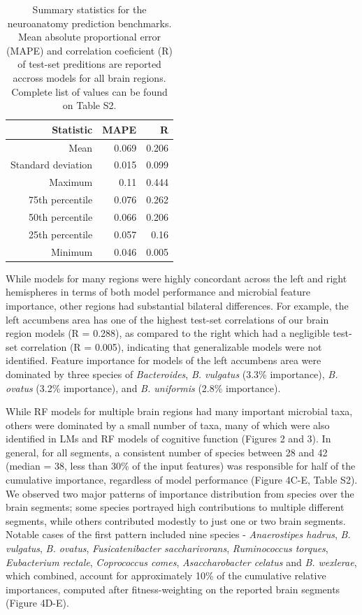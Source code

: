 \documentclass{article}
\begin{document}
\begin{table}[!h]
    \begin{center}
    \begin{tabular}{|r|r|r|}
      \hline\hline
      \textbf{Statistic} & \textbf{MAPE} & \textbf{R} \\\hline
      Mean & 0.069 & 0.206 \\
      Standard deviation & 0.015 & 0.099 \\
      Maximum & 0.11 & 0.444 \\
      75th percentile & 0.076 & 0.262 \\
      50th percentile & 0.066 & 0.206 \\
      25th percentile & 0.057 & 0.16 \\
      Minimum & 0.046 & 0.005 \\\hline
    \end{tabular}
    \caption{\label{tab:neuro}Summary statistics for the neuroanatomy prediction benchmarks.
    Mean absolute proportional error (MAPE) and correlation coeficient (R)
    of test-set preditions are reported accross models for all brain regions.
    Complete list of values can be found on Table S2.}
    \end{center}
\end{table}

While models for many regions were highly concordant across the
left and right hemispheres in terms of both model performance and
microbial feature importance, other regions had substantial
bilateral differences. For example, the left accumbens area
has one of the highest test-set correlations of our
brain region models (R = 0.288), as compared to the right which
had a negligible test-set correlation (R = 0.005),
indicating that generalizable models were not identified.
Feature importance for models of the left accumbens area were dominated
by three species of \emph{Bacteroides}, \emph{B. vulgatus} (3.3\% importance),
\emph{B. ovatus} (3.2\% importance), and
\emph{B. uniformis} (2.8\% importance).

While RF models for multiple brain regions had many important microbial taxa,
others were dominated by a small number of taxa, many of which
were also identified in LMs and RF models of cognitive function (Figures 2 and 3). 
In general, for all segments, a consistent number of species between 28 and 42 (median = 38, less than 30\% of the input features)
was responsible for half of the cumulative importance,
regardless of model performance (Figure 4C-E, Table S2).
We observed two major patterns of importance distribution from
species over the brain segments; some species portrayed high contributions
to multiple different segments, while others contributed modestly to
just one or two brain segments. Notable cases of the first pattern
included nine species - 
\emph{Anaerostipes hadrus},
\emph{B. vulgatus},
\emph{B. ovatus},
\emph{Fusicatenibacter saccharivorans},
\emph{Ruminococcus torques},
\emph{Eubacterium rectale},
\emph{Coprococcus comes},
\emph{Asaccharobacter celatus} and
\emph{B. wexlerae}, which combined, account for approximately 10\% of the cumulative relative importances,
computed after fitness-weighting on the reported brain segments (Figure 4D-E).
\end{document}
